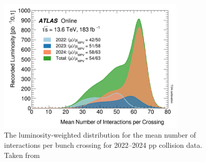 \begin{figure}
    \centering
    \includegraphics[width=0.8\textwidth]{figures/atlas/atlas_run3_pileup.png}
    \caption{The luminosity-weighted distribution for the mean number of interactions per bunch crossing for 2022--2024 pp collision data. Taken from~\cite{atlas_pileup_image}}\label{fig:atlas_run3_pileup}
\end{figure}